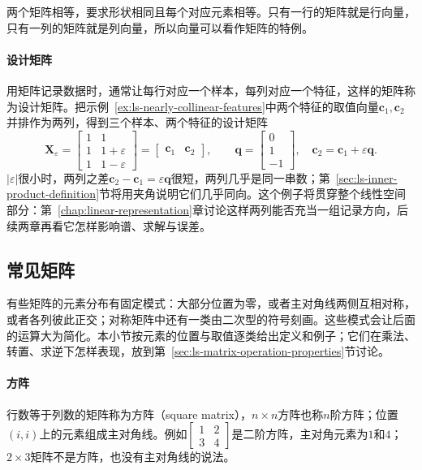 两个矩阵相等，要求形状相同且每个对应元素相等。只有一行的矩阵就是行向量，只有一列的矩阵就是列向量，所以向量可以看作矩阵的特例。

\paragraph{设计矩阵}
用矩阵记录数据时，通常让每行对应一个样本，每列对应一个特征，这样的矩阵称为设计矩阵。把示例~\ref{ex:ls-nearly-collinear-features}中两个特征的取值向量$\bm c_1,\bm c_2$并排作为两列，得到三个样本、两个特征的设计矩阵
\begin{equation}
 \bm X_{\varepsilon}
 =\begin{bmatrix}1&1\\1&1+\varepsilon\\1&1-\varepsilon\end{bmatrix}
 =\begin{bmatrix}\bm c_1&\bm c_2\end{bmatrix},
 \qquad
 \bm q=\begin{bmatrix}0\\1\\-1\end{bmatrix},
 \quad \bm c_2=\bm c_1+\varepsilon\bm q.
 \label{eq:linear-algebra-nearly-collinear-design}
\end{equation}
$|\varepsilon|$很小时，两列之差$\bm c_2-\bm c_1=\varepsilon\bm q$很短，两列几乎是同一串数；第~\ref{sec:ls-inner-product-definition}节将用夹角说明它们几乎同向。这个例子将贯穿整个线性空间部分：第~\ref{chap:linear-representation}章讨论这样两列能否充当一组记录方向，后续两章再看它怎样影响谱、求解与误差。

\subsection{常见矩阵}
\label{sec:prelim-common-matrices}

有些矩阵的元素分布有固定模式：大部分位置为零，或者主对角线两侧互相对称，或者各列彼此正交；对称矩阵中还有一类由二次型的符号刻画。这些模式会让后面的运算大为简化。本小节按元素的位置与取值逐类给出定义和例子；它们在乘法、转置、求逆下怎样表现，放到第~\ref{sec:ls-matrix-operation-properties}节讨论。

\paragraph{方阵}
行数等于列数的矩阵称为方阵（square matrix），$n\times n$方阵也称$n$阶方阵；位置$(i,i)$上的元素组成主对角线。例如$\left[\begin{smallmatrix}1&2\\3&4\end{smallmatrix}\right]$是二阶方阵，主对角元素为$1$和$4$；$2\times3$矩阵不是方阵，也没有主对角线的说法。

